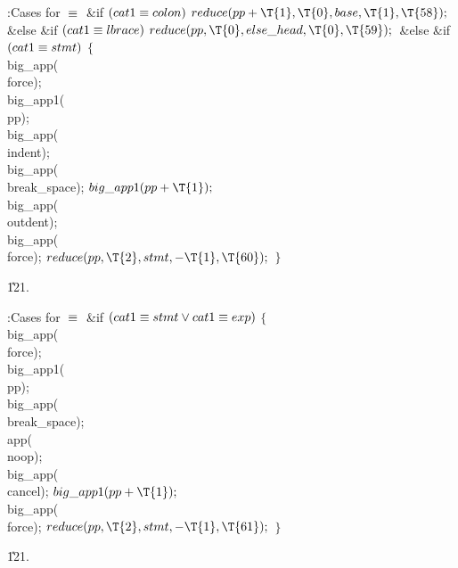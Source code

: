 \B{}:Cases for \X${}\equiv{}$\6
\&{if} ${}(\\{cat1}\equiv\\{colon}){}$\1\5
${}\\{reduce}(\\{pp}+\T{1},\39\T{0},\39\\{base},\39\T{1},\39\T{58});{}$\2\6
\&{else} \&{if} ${}(\\{cat1}\equiv\\{lbrace}){}$\1\5
${}\\{reduce}(\\{pp},\39\T{0},\39\\{else\_head},\39\T{0},\39\T{59});{}$\2\6
\&{else} \&{if} ${}(\\{cat1}\equiv\\{stmt}){}$\5
${}\{{}$\1\6
\\{big\_app}(\\{force});\6
\\{big\_app1}(\\{pp});\6
\\{big\_app}(\\{indent});\6
\\{big\_app}(\\{break\_space});\6
${}\\{big\_app1}(\\{pp}+\T{1});{}$\6
\\{big\_app}(\\{outdent});\6
\\{big\_app}(\\{force});\6
${}\\{reduce}(\\{pp},\39\T{2},\39\\{stmt},\39{-}\T{1},\39\T{60});{}$\6
\4${}\}{}$\2\par
\U121.\fi

\B{}:Cases for \X${}\equiv{}$\6
\&{if} ${}(\\{cat1}\equiv\\{stmt}\lor\\{cat1}\equiv\\{exp}){}$\5
${}\{{}$\1\6
\\{big\_app}(\\{force});\6
\\{big\_app1}(\\{pp});\6
\\{big\_app}(\\{break\_space});\6
\\{app}(\\{noop});\6
\\{big\_app}(\\{cancel});\6
${}\\{big\_app1}(\\{pp}+\T{1});{}$\6
\\{big\_app}(\\{force});\6
${}\\{reduce}(\\{pp},\39\T{2},\39\\{stmt},\39{-}\T{1},\39\T{61});{}$\6
\4${}\}{}$\2\par
\U121.\fi

